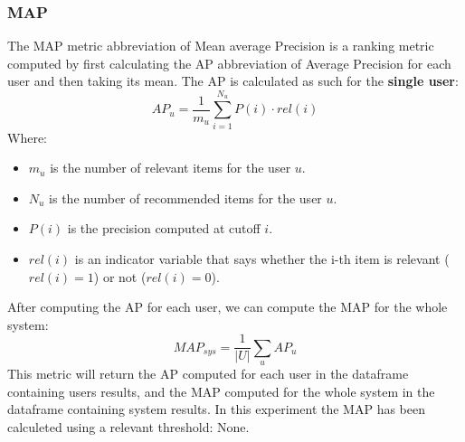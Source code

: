 \documentclass[11pt]{article}
\begin{document}
\subsubsection{MAP}\label{subsubsec:map}
The MAP metric abbreviation of Mean average Precision is a ranking metric computed by first calculating the AP
abbreviation of Average Precision for each user and then taking its mean.
The AP is calculated as such for the \textbf{single user}:
\hfill\break
\hfill\break
    \[
        AP_u = \frac{1}{m_u}\sum_{i=1}^{N_u}P(i)\cdot rel(i)
    \]
\hfill\break
\hfill\break
    Where:
\begin{itemize}
    \item $m_u$ is the number of relevant items for the user $u$.
    \item $N_u$ is the number of recommended items for the user $u$.
    \item $P(i)$ is the precision computed at cutoff $i$.
    \item $rel(i)$ is an indicator variable that says whether the i-th item is relevant ($rel(i)=1$) or not ($rel(i)=0$).
\end{itemize}
\hfill\break
\hfill\break
After computing the AP for each user, we can compute the MAP for the whole system:
\hfill\break
\hfill\break
    \[
        MAP_{sys} = \frac{1}{|U|}\sum_{u}AP_u
    \]
\hfill\break
\hfill\break
This metric will return the AP computed for each user in the dataframe containing users results, and the MAP
computed for the whole system in the dataframe containing system results.
In this experiment the MAP has been calculeted using a relevant threshold:
None.
\hfill\break
\hfill\break


\end{document}

